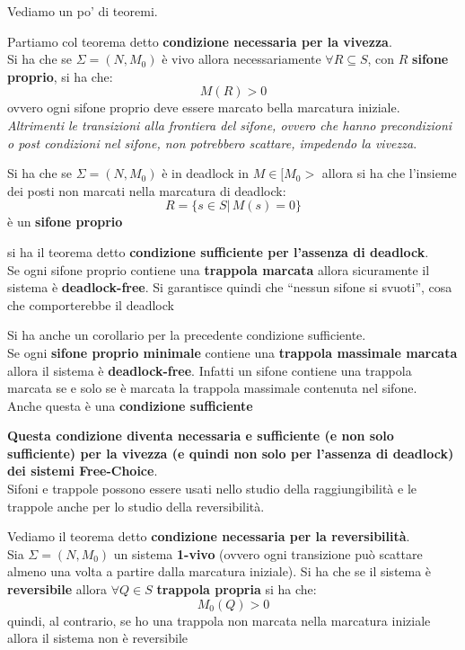 \documentclass[a4paper,12pt, oneside]{book}
\begin{document}
Vediamo un po' di teoremi.
\begin{teorema}
  Partiamo col teorema detto \textbf{condizione necessaria per la vivezza}.\\
  Si ha che se $\Sigma=(N,M_0)$ è vivo allora necessariamente $\forall
  R\subseteq S$, con $R$ \textbf{sifone proprio}, si ha che:
  \[M(R)>0\]
  ovvero ogni sifone proprio deve essere marcato bella marcatura iniziale.\\
  \textit{Altrimenti le transizioni alla frontiera del sifone, ovvero che hanno
    precondizioni o post condizioni nel sifone, non potrebbero scattare,
    impedendo la vivezza}.\\
\end{teorema}
\begin{teorema}
  Si ha che se $\Sigma=(N,M_0)$ è in deadlock in $M\in[M_0>$ allora si ha che
  l'insieme dei posti non marcati nella marcatura di deadlock:
  \[R=\{s\in S|\,M(s)=0\}\]
  è un \textbf{sifone proprio}
\end{teorema}
\begin{teorema}
  si ha il teorema detto \textbf{condizione sufficiente per l’assenza di
    deadlock}.\\ 
  Se ogni sifone proprio contiene una \textbf{trappola marcata} allora
  sicuramente il sistema è \textbf{deadlock-free}. Si garantisce quindi che
  ``nessun sifone si svuoti'', cosa che comporterebbe il deadlock
\end{teorema}
\begin{corollario}
  Si ha anche un corollario per la precedente condizione sufficiente.\\
  Se ogni \textbf{sifone proprio minimale} contiene una \textbf{trappola
    massimale marcata} allora il sistema è \textbf{deadlock-free}. Infatti
  un sifone contiene una trappola marcata se e solo se è marcata la trappola
  massimale contenuta nel sifone.\\
  Anche questa è una \textbf{condizione sufficiente}
\end{corollario}
\textbf{Questa condizione diventa necessaria e sufficiente (e non solo
  sufficiente) per la vivezza (e quindi non solo per l'assenza di deadlock)
  dei sistemi Free-Choice}.\\
Sifoni e trappole possono essere usati nello studio della raggiungibilità e le
trappole anche per lo studio della reversibilità.
\begin{teorema}
  Vediamo il teorema detto \textbf{condizione necessaria per la
    reversibilità}.\\
  Sia $\Sigma=(N,M_0)$ un sistema \textbf{1-vivo} (ovvero ogni transizione può
  scattare almeno una volta a partire dalla marcatura iniziale). Si ha che se il
  sistema è \textbf{reversibile} allora $\forall Q\in S$ \textbf{trappola
    propria} si ha che: 
  \[M_0(Q)>0\]
  quindi, al contrario, se ho una trappola non marcata nella marcatura iniziale
  allora il sistema non è reversibile
\end{teorema}
\end{document}
